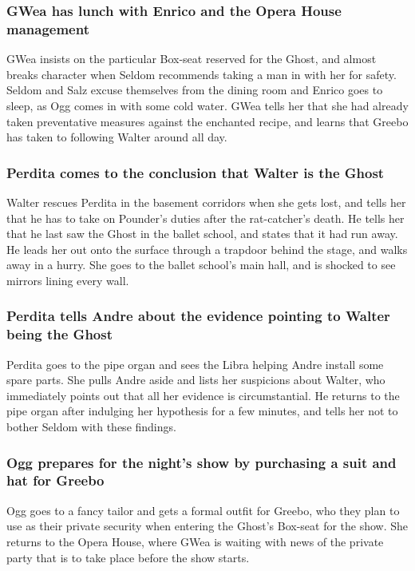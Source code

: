 \subsubsection{\Gls{GWea} has lunch with \Gls{Enrico} and the Opera House management}
\Gls{GWea} insists on the particular Box-seat reserved for the \Gls{Ghost}, and almost breaks
character when \Gls{Seldom} recommends taking a man in with her for safety. \Gls{Seldom} and
\Gls{Salz} excuse themselves from the dining room and \Gls{Enrico} goes to sleep, as \Gls{Ogg}
comes in with some cold water. \Gls{GWea} tells her that she had already taken preventative
measures against the enchanted recipe, and learns that \Gls{Greebo} has taken to following
\Gls{Walter} around all day.

\subsubsection{\Gls{Perdita} comes to the conclusion that \Gls{Walter} is the \Gls{Ghost}}
\Gls{Walter} rescues \Gls{Perdita} in the basement corridors when she gets lost, and tells her that
he has to take on \Gls{Pounder}'s duties after the rat-catcher's death. He tells her that he last
saw the \Gls{Ghost} in the ballet school, and states that it had run away. He leads her out onto
the surface through a trapdoor behind the stage, and walks away in a hurry. She goes to the ballet
school's main hall, and is shocked to see mirrors lining every wall.

\subsubsection{\Gls{Perdita} tells \Gls{Andre} about the evidence pointing to \Gls{Walter} being
    the \Gls{Ghost}}
\Gls{Perdita} goes to the pipe organ and sees the \Gls{Libra} helping \Gls{Andre} install some
spare parts. She pulls \Gls{Andre} aside and lists her suspicions about \Gls{Walter}, who
immediately points out that all her evidence is circumstantial. He returns to the pipe organ after
indulging her hypothesis for a few minutes, and tells her not to bother \Gls{Seldom} with these
findings.

\subsubsection{\Gls{Ogg} prepares for the night's show by purchasing a suit and hat for
    \Gls{Greebo}}
\Gls{Ogg} goes to a fancy tailor and gets a formal outfit for \Gls{Greebo}, who they plan to use
as their private security when entering the \Gls{Ghost}'s Box-seat for the show. She returns to the
Opera House, where \Gls{GWea} is waiting with news of the private party that is to take place before
the show starts.

